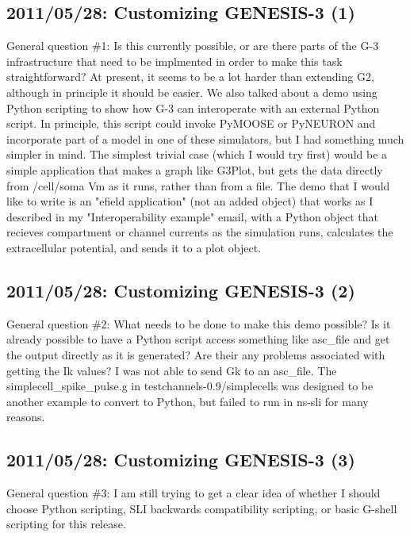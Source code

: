 \documentclass[12pt]{article}
\begin{document}
\subsection{2011/05/28: Customizing GENESIS-3 (1)}

General question \#1: Is this currently possible, or are there parts of
the G-3 infrastructure that need to be implmented in order to make
this task straightforward?  At present, it seems to be a lot harder
than extending G2, although in principle it should be easier. We also
talked about a demo using Python scripting to show how G-3 can
interoperate with an external Python script.  In principle, this
script could invoke PyMOOSE or PyNEURON and incorporate part of a
model in one of these simulators, but I had something much simpler in
mind.  The simplest trivial case (which I would try first) would be a
simple application that makes a graph like G3Plot, but gets the data
directly from /cell/soma Vm as it runs, rather than from a file.  The
demo that I would like to write is an "efield application" (not an
added object) that works as I described in my "Interoperability
example" email, with a Python object that recieves compartment or
channel currents as the simulation runs, calculates the extracellular
potential, and sends it to a plot object.


\subsection{2011/05/28: Customizing GENESIS-3 (2)}

General question \#2: What needs to be done to make this demo
possible?  Is it already possible to have a Python script access
something like asc\_file and get the output directly as it is
generated?  Are their any problems associated with getting the Ik
values?  I was not able to send Gk to an asc\_file.  The
simplecell\_spike\_pulse.g in testchannels-0.9/simplecells was designed
to be another example to convert to Python, but failed to run in
ns-sli for many reasons.


\subsection{2011/05/28: Customizing GENESIS-3 (3)}

General question \#3: I am still trying to get a clear idea of whether
I should choose Python scripting, SLI backwards compatibility
scripting, or basic G-shell scripting for this release.
\end{document}
